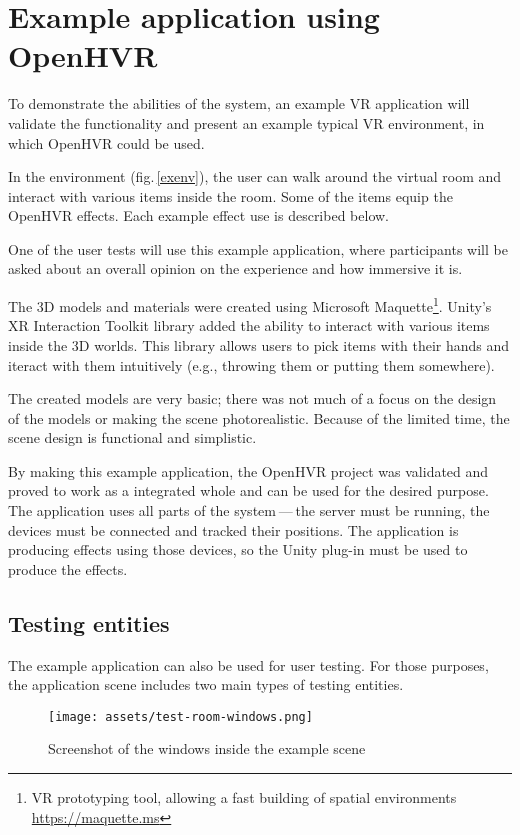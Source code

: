 \chapter{Example application using OpenHVR}\label{exampleapp}

To demonstrate the abilities of the system, an example VR application
will validate the functionality and present an example typical VR
environment, in which OpenHVR could be used.

In the environment (fig.\,\ref{exenv}), the user can walk around the virtual 
room and interact with various items inside the room. Some of the items equip the OpenHVR
effects. Each example effect use is described below.

One of the user tests will use this example application, where
participants will be asked about an overall opinion on the experience and
how immersive it is.

The 3D models and materials were created using Microsoft Maquette\footnote{VR 
prototyping tool, allowing a fast building of spatial 
environments \href{https://maquette.ms}{https://maquette.ms}}.
Unity’s XR Interaction Toolkit library added the ability to
interact with various items inside the 3D worlds. This library allows users to
pick items with their hands and iteract with them intuitively (e.g., throwing them
or putting them somewhere).


The created models are very basic; there was not much of a focus on the design
of the models or making the scene photorealistic. Because of the limited time,
the scene design is functional and simplistic.


By making this example application, the OpenHVR project was validated and proved
to work as a integrated whole and can be used for the desired purpose. The application uses
all parts of the system — the server must be running, the devices must be
connected and tracked their positions. The application is producing effects
using those devices, so the Unity plug-in must be used to produce the effects.

\hypertarget{x-testing-entities}{\section{Testing entities}}
The example application can also be used for user testing. For those purposes,
the application scene includes two main types of testing entities.

\newpage

\begin{figure}[h]{}
    \centering\texttt{[image: assets/test-room-windows.png]}
    \caption{Screenshot of the windows inside the example scene}
    \end{figure}

